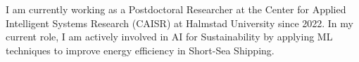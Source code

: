 \documentclass[11pt,letterpaper,sans]{moderncv}   %
\begin{document}


%
%
%
%
%
%
%
%
%
%
%

I am currently working as a Postdoctoral Researcher at the Center for Applied Intelligent Systems Research (CAISR) at Halmstad University since 2022. In my current role, I am actively involved in AI for Sustainability by applying ML techniques to improve energy efficiency in Short-Sea Shipping.\\
\end{document}

